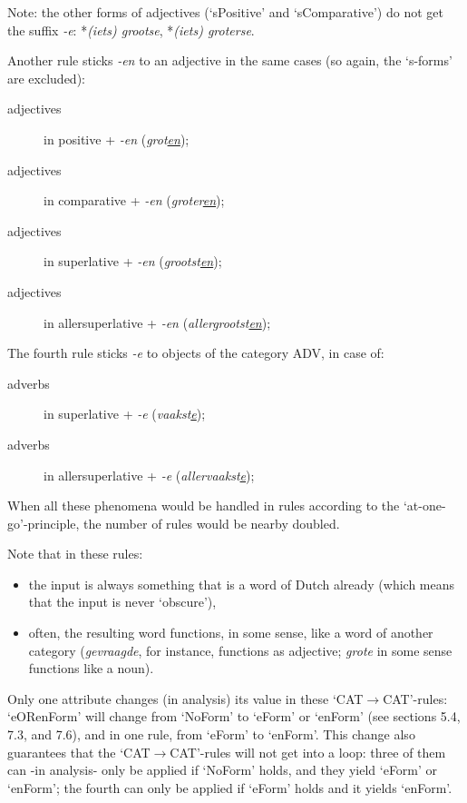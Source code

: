 Note: the other forms of adjectives (`sPositive' and `sComparative') 
do not get the suffix {\em -e}: *{\em (iets) grootse}, *{\em (iets) groterse}.

Another rule sticks {\em -en} to an adjective in the same cases (so again,
the `s-forms' are excluded):

\begin{description}
  \item [adjectives] in positive     + {\em -en} ({\em grot\underline{en}});
  \item [adjectives] in comparative  + {\em -en} ({\em groter\underline{en}});
  \item [adjectives] in superlative  + {\em -en} ({\em grootst\underline{en}});
  \item [adjectives] in allersuperlative + {\em -en} 
        ({\em allergrootst\underline{en}});
\end{description}

The fourth rule sticks {\em -e} to objects of the category ADV, in case of:

\begin{description}
  \item [adverbs] in superlative      + {\em -e}  ({\em vaakst\underline{e}});
  \item [adverbs] in allersuperlative + {\em -e}  
        ({\em allervaakst\underline{e}});
\end{description}

When all these phenomena would be handled 
in rules according to the `at-one-go'-principle, the number of rules would 
be nearby doubled.

Note that in these rules:

\begin{itemize}
  \item the input is always something that is a word of Dutch already (which 
        means that the input is never `obscure'),
  \item often, the resulting word functions, in some sense, like a word of 
        another category ({\em gevraagde}, for instance, functions as 
        adjective; {\em grote} in some sense functions like a noun).
\end{itemize}

Only one attribute changes (in analysis) its value in these 
`CAT$\longrightarrow$CAT'-rules: `eORenForm' 
will change from `NoForm' to `eForm' or `enForm'
(see sections 5.4, 7.3, and 7.6), and in one rule, from `eForm' to `enForm'.
This change also guarantees that the
`CAT$\longrightarrow$CAT'-rules will not get into a loop:
three of them can
-in analysis- only be applied if `NoForm' holds, and they yield `eForm' or
`enForm'; the fourth can only be applied if `eForm' holds and it yields
`enForm'.

